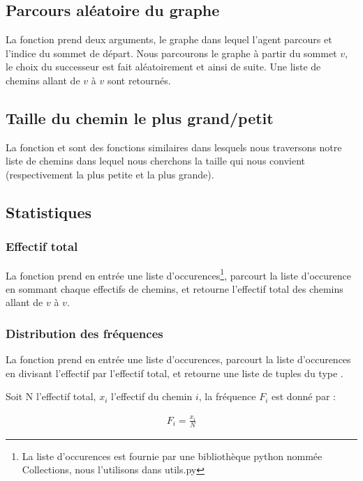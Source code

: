 \documentclass[a4paper, 11pt, oneside]{article}
\begin{document}
		\subsection{Parcours aléatoire du graphe}
			La fonction  prend deux arguments,  le graphe dans lequel l'agent parcours et  l'indice du sommet de départ. Nous parcourons le graphe à partir du sommet $v$, le choix du successeur est fait aléatoirement et ainsi de suite. Une liste de chemins allant de $v$ à $v$ sont retournés.
		
		\subsection{Taille du chemin le plus grand/petit}
			La fonction  et  sont des fonctions similaires dans lesquels nous traversons notre liste de chemins dans lequel nous cherchons la taille qui nous convient (respectivement la plus petite et la plus grande).
			
		\subsection{Statistiques}
			\subsubsection{Effectif total}
				La fonction  prend en entrée une liste d'occurences\footnote{La liste d'occurences est fournie par une bibliothèque python nommée Collections, nous l'utilisons dans utils.py}, parcourt la liste d'occurence en sommant chaque effectifs de chemins, et retourne l'effectif total des chemins allant de $v$ à $v$.
			\subsubsection{Distribution des fréquences}
				La fonction  prend en entrée une liste d'occurences, parcourt la liste d'occurences en divisant l'effectif par l'effectif total, et retourne une liste de tuples du type . 
				
				Soit N l'effectif total, $x_i$ l'effectif du chemin $i$, la fréquence $F_i$ est donné par :
				
				\begin{ceqn}
					\begin{align*}
					F_i = \frac{x_i}{N}
					\end{align*}
				\end{ceqn}
				
\end{document}
